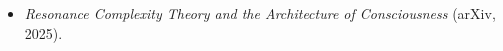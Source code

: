 \begin{itemize}[nosep]
  \item \emph{Resonance Complexity Theory and the Architecture of
        Consciousness} (arXiv, 2025).
\end{itemize}
